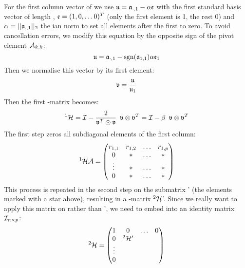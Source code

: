 For the first column vector of  we use \(\mathfrak{u} = \mathfrak{a}_{\cdot,1} - \alpha \mathfrak{e} \) with the first standard basis vector of length , \(\mathfrak{e} = (1, 0,\ldots 0)^T \) (only the first element is 1, the rest 0) and \(\alpha = ||\mathfrak{a}_{\cdot,1}||_2 \) the ian norm to set all elements after the first to zero. To avoid cancellation errors, we modify this equation by the opposite sign of the pivot element \(\mathcal{A}_{k,k} \):
\begin{equation}
  \mathfrak{u} = \mathfrak{a}_{\cdot,1} - \operatorname{sgn}(\mathfrak{a}_{1,1}) \alpha \mathfrak{e}_1
\end{equation}
Then we normalise this vector by its first element:
\begin{equation}
   \mathfrak{v} = \frac{\mathfrak{u}}{\mathfrak{u}_1}
\end{equation}
Then the first -matrix becomes:
\begin{equation}
  ^1\mathcal{H} = \mathcal{I} - \frac{2}{\mathfrak{v}^T \odot \mathfrak{v}}\enspace \mathfrak{v} \otimes \mathfrak{v}^T = \mathcal{I} - \beta \enspace \mathfrak{v} \otimes \mathfrak{v}^T
\end{equation}
The first step zeros all subdiagonal elements of the first column:
\begin{equation}
   ^1\mathcal{H} \mathcal{A} = \begin{pmatrix}
                                  r_{1,1} & r_{1,2} &  \ldots & r_{1,p} \\
                                  0                & *                &  \ldots & *                \\
                                  \vdots           & *                &  \ldots & *                \\
                                  0                & *                &  \ldots & *                \\
                               \end{pmatrix}
\end{equation}
This process is repeated in the second step on the submatrix ' (the elements marked with a star above), resulting in a -matrix \(^2\mathcal{H} \)'. Since we really want to apply this matrix on  rather than ', we need to embed into an identity matrix \(\mathcal{I}_{n\times p} \):
\begin{equation}
  ^2\mathcal{H} = \begin{pmatrix}
                                  1       & 0           &  \ldots & 0 \\
                                  0       & ^2\mathcal{H}'  &         &   \\
                                  \vdots  &             &         &   \\
                                  0       &             &         &   \\
                               \end{pmatrix}
\end{equation}

